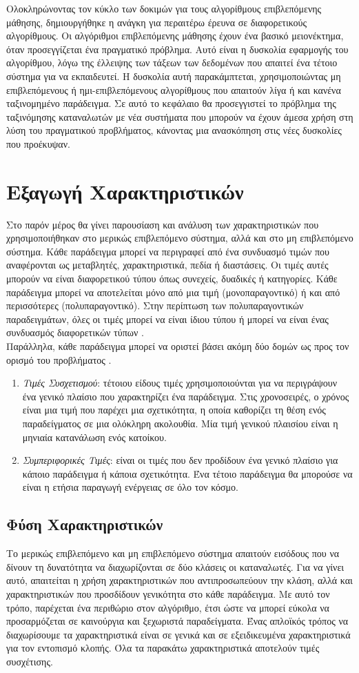 Ολοκληρώνοντας τον κύκλο των δοκιμών για τους αλγορίθμους επιβλεπόμενης μάθησης, δημιουργήθηκε η ανάγκη για περαιτέρω έρευνα σε διαφορετικούς αλγορίθμους. Οι αλγόριθμοι επιβλεπόμενης μάθησης έχουν ένα βασικό μειονέκτημα, όταν προσεγγίζεται ένα πραγματικό πρόβλημα. Αυτό είναι η δυσκολία εφαρμογής του αλγορίθμου, λόγω της έλλειψης των τάξεων των δεδομένων που απαιτεί ένα τέτοιο σύστημα για να εκπαιδευτεί. Η δυσκολία αυτή παρακάμπτεται, χρησιμοποιώντας μη επιβλεπόμενους ή ημι-επιβλεπόμενους αλγορίθμους που απαιτούν λίγα ή και κανένα ταξινομημένο παράδειγμα. Σε αυτό το κεφάλαιο θα προσεγγιστεί το πρόβλημα της ταξινόμησης καταναλωτών με νέα συστήματα που μπορούν να έχουν άμεσα χρήση στη λύση του πραγματικού προβλήματος, κάνοντας μια ανασκόπηση στις νέες δυσκολίες που προέκυψαν.
\section{Εξαγωγή Χαρακτηριστικών}
Στο παρόν μέρος θα γίνει παρουσίαση και ανάλυση των χαρακτηριστικών που χρησιμοποιήθηκαν στο μερικώς επιβλεπόμενο σύστημα, αλλά και στο μη επιβλεπόμενο σύστημα. Κάθε παράδειγμα μπορεί να περιγραφεί από ένα συνδυασμό τιμών που αναφέρονται ως μεταβλητές, χαρακτηριστικά, πεδία ή διαστάσεις. Οι τιμές αυτές μπορούν να είναι διαφορετικού τύπου όπως συνεχείς, δυαδικές ή κατηγορίες. Κάθε παράδειγμα μπορεί να αποτελείται μόνο από μια τιμή (μονοπαραγοντικό) ή και από περισσότερες (πολυπαραγοντικό). Στην περίπτωση των πολυπαραγοντικών παραδειγμάτων, όλες οι τιμές μπορεί να είναι ίδιου τύπου ή μπορεί να είναι ένας συνδυασμός διαφορετικών τύπων \cite{Anomaly}.\\
Παράλληλα, κάθε παράδειγμα μπορεί να οριστεί βάσει ακόμη δύο δομών ως προς τον ορισμό του προβλήματος \cite{Anomaly}.
\begin{enumerate}
\item{\textit{Τιμές Συσχετισμού}}: τέτοιου είδους τιμές χρησιμοποιούνται για να περιγράψουν ένα γενικό πλαίσιο που χαρακτηρίζει ένα παράδειγμα. Στις χρονοσειρές, ο χρόνος είναι μια τιμή που παρέχει μια σχετικότητα, η οποία καθορίζει τη θέση ενός παραδείγματος σε μια ολόκληρη ακολουθία. Μία τιμή γενικού πλαισίου είναι η μηνιαία κατανάλωση ενός κατοίκου.
\item{\textit{Συμπεριφορικές Τιμές}}: είναι οι τιμές που δεν προδίδουν ένα γενικό πλαίσιο για κάποιο παράδειγμα ή κάποια σχετικότητα. Ένα τέτοιο παράδειγμα θα μπορούσε να είναι η ετήσια παραγωγή ενέργειας σε όλο τον κόσμο.
\end{enumerate}
\subsection{Φύση Χαρακτηριστικών}
Το μερικώς επιβλεπόμενο και μη επιβλεπόμενο σύστημα απαιτούν εισόδους που να δίνουν τη δυνατότητα να διαχωρίζονται σε δύο κλάσεις οι καταναλωτές. Για να γίνει αυτό, απαιτείται η χρήση χαρακτηριστικών που αντιπροσωπεύουν την κλάση, αλλά και χαρακτηριστικών που προσδίδουν γενικότητα στο κάθε παράδειγμα. Με αυτό τον τρόπο, παρέχεται ένα περιθώριο στον αλγόριθμο, έτσι ώστε να μπορεί εύκολα να προσαρμόζεται σε καινούργια και ξεχωριστά παραδείγματα. Ένας απλοϊκός τρόπος να διαχωρίσουμε τα χαρακτηριστικά είναι σε γενικά και σε εξειδικευμένα χαρακτηριστικά για τον εντοπισμό κλοπής. Όλα τα παρακάτω χαρακτηριστικά αποτελούν τιμές συσχέτισης.
